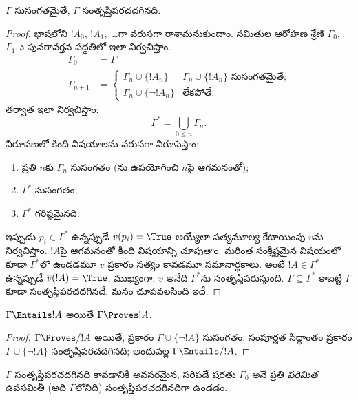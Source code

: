 \documentclass[../../../include/open-logic-section]{subfiles}
\begin{document}
\begin{thm}[సంపూర్ణత]
$\Gamma$ సుసంగతమైతే, $\Gamma$ సంతృప్తిపరచదగినది.
\end{thm}

\begin{proof}
భాషలోని  $!A_0$, $!A_1$,~\dots గా వరుసగా రాశామనుకుందాం.  సమితుల ఆరోహణ శ్రేణి $\Gamma_0$, $\Gamma_1$,~ు పునరావర్తన పద్ధతిలో ఇలా నిర్వచిస్తాం.
\begin{align*}
\Gamma_0 & = \Gamma\\
\Gamma_{n+1} &  =
\begin{cases}
  \Gamma_n \cup \{!A_n\} & \text{$\Gamma_n \cup \{!A_n\}$ సుసంగతమైతే;}\\
  \Gamma_n \cup \{\lnot !A_n\} & \text{లేకపోతే}.
\end{cases}
\end{align*}
తర్వాత ఇలా నిర్వచిస్తాం:
\[
\Gamma^* = \bigcup_{0\le n}\Gamma_n.
\]
నిరూపణలో కింది విషయాలను వరుసగా నిరూపిస్తాం:
\begin{enumerate}
\item ప్రతి $n$కు $\Gamma_n$ సుసంగతం (ను ఉపయోగించి $n$పై ఆగమనంతో);
\item $\Gamma^*$ సుసంగతం;
\item $\Gamma^*$ గరిష్ఠమైనది.
\end{enumerate}
ఇప్పుడు $p_i \in \Gamma^*$ ఉన్నప్పుడే $v(p_i) = \True$ అయ్యేలా సత్యమూల్య కేటాయింపు $v$ను నిర్వచిస్తాం. $!A$పై ఆగమనంతో కింది విషయాన్ని చూపుతాం. మరింత సంక్లిష్టమైన  విషయంలో కూడా $\Gamma^*$లో ఉండడమూ $v$ ప్రకారం సత్యం కావడమూ సమానార్థకాలు. అంటే $!A \in \Gamma^*$ ఉన్నప్పుడే $\overline{v}(!A) = \True$. ముఖ్యంగా, $v$ అనేది $\Gamma^*$ను సంతృప్తిపరుస్తుంది. $\Gamma \subseteq \Gamma^*$ కాబట్టి $\Gamma$ కూడా సంతృప్తిపరచదగినదే. మనం చూపవలసింది ఇదే.
\end{proof}

\begin{cor}
$\Gamma \Entails !A$ అయితే $\Gamma \Proves !A$.
\end{cor}

\begin{proof}
$\Gamma\Proves/ !A$ అయితే,  ప్రకారం $\Gamma \cup \{\lnot !A\}$ సుసంగతం. సంపూర్ణత సిద్ధాంతం ప్రకారం $\Gamma \cup \{\lnot !A\}$ సంతృప్తిపరచదగినది; అందువల్ల $\Gamma \Entails/ !A$.
\end{proof}

\begin{prop}[సంహతత్వ సిద్ధాంతం]
$\Gamma$ సంతృప్తిపరచదగినది కావడానికి అవసరమైన, సరిపడే షరతు $\Gamma_0$ అనే ప్రతి \emph{పరిమిత} ఉపసమితీ (అది $\Gamma$లోనిది) సంతృప్తిపరచదగినదిగా ఉండడం.
\end{prop}
\end{document}
